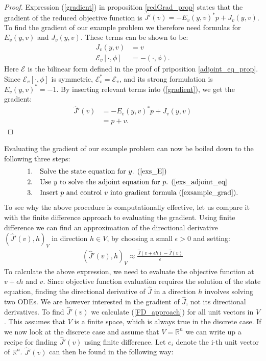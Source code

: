 \begin{proof}
Expression (\ref{gradient}) in proposition \ref{redGrad_prop} states that the gradient of the reduced objective function is $\hat J'(v) = -E_v(y,v)^*p + J_v(y,v)$. To find the gradient of our example problem we therefore need formulas for $E_v(y,v)$ and $J_v(y,v)$. These terms can be shown to be:
\begin{align*}
J_v(y,v) &= v \\
\mathcal{E}_v[\cdot,\phi] &= -(\cdot,\phi).
\end{align*}
Here $\mathcal{E}$ is the bilinear form defined in the proof of priposition \ref{adjoint_eq_prop}. Since $\mathcal{E}_v[\cdot,\phi]$ is symmetric, $\mathcal{E}_v^*=\mathcal{E}_v$, and its strong formulation is $E_v(y,v)^*=-1$. By inserting relevant terms into (\ref{gradient}), we get the gradient:
\begin{align}
\hat{J}'(v)&=-E_v(y,v)^*p + J_v(y,v) \\
&= p+v. \label{exs_grad}
\end{align} 
\end{proof}
\noindent
Evaluating the gradient of our example problem can now be boiled down to the following three steps:
\begin{align*}
1.\quad & \textrm{Solve the state equation for $y$. (\ref{exs_E})}\\
2.\quad & \textrm{Use $y$ to solve the adjoint equation for $p$. (\ref{exs_adjoint_eq}}\\
3.\quad & \textrm{Insert $p$ and control $v$ into gradient formula (\ref{exsample_grad}).}
\end{align*}
To see why the above procedure is computationally effective, let us compare it with the finite difference approach to evaluating the gradient. Using finite difference we can find an approximation of the directional derivative $(\hat J'(v),h)_V$ in direction $h\in V$, by choosing a small $\epsilon>0$ and setting:
\begin{align}
(\hat J'(v), h)_V\approx\frac{\hat J(v+\epsilon h)-\hat J(v)}{\epsilon} \label{FD_approach}
\end{align} 
To calculate the above expression, we need to evaluate the objective function at $v+\epsilon h$ and $v$. Since objective function evaluation requires the solution of the state equation, finding the directional derivative of $\hat J$ in a direction $h$ involves solving two ODEs. We are however interested in the gradient of $\hat J$, not its directional derivatives. To find $\hat J'(v)$ we calculate (\ref{FD_approach}) for all unit vectors in $V$. This assumes that $V$ is a finite space, which is always true in the discrete case. If we now look at the discrete case and assume that $V=\mathbb{R}^n$ we can write up a recipe for finding $\hat J'(v)$ using finite difference. Let $e_i$ denote the i-th unit vector of $\mathbb{R}^n$. $\hat J'(v)$ can then be found in the following way:
